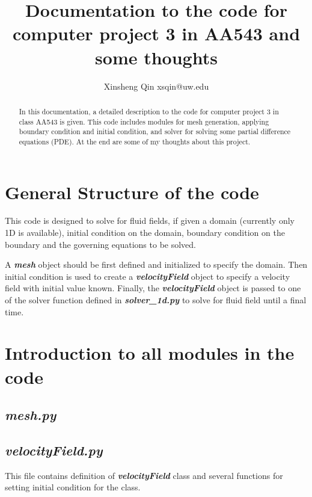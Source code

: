 \documentclass[11pt]{article}
\title{Documentation to the code for computer project 3 in AA543 and some thoughts}
\author{Xinsheng Qin xsqin@uw.edu}
\begin{document}
\maketitle

\begin{abstract}
In this documentation, a detailed description to the code for computer project 3 in class AA543 is given.
This code includes modules for mesh generation, applying boundary condition and initial condition, and solver for solving some partial difference equations (PDE). 
At the end are some of my thoughts about this project.
\end{abstract}

\section{General Structure of the code}
This code is designed to solve for fluid fields, if given a domain (currently only 1D is available), initial condition on the domain, boundary condition on the boundary and the governing equations to be solved.
\par

A \textbf{\textit{mesh}} object should be first defined and initialized to specify the domain. 
Then initial condition is used to create a \textbf{\textit{velocityField}} object to specify a velocity field with initial value known. 
Finally, the \textbf{\textit{velocityField}} object is passed to one of the solver function defined in \textbf{\textit{solver\_1d.py}} to solve for fluid field until a final time. 

\section{Introduction to all modules in the code}
    \subsection{\textbf{\textit{mesh.py}}}
    
    \subsection{\textbf{\textit{velocityField.py}}}
    This file contains definition of \textbf{\textit{velocityField}} class and several functions for setting initial condition for the class.
\end{document}

